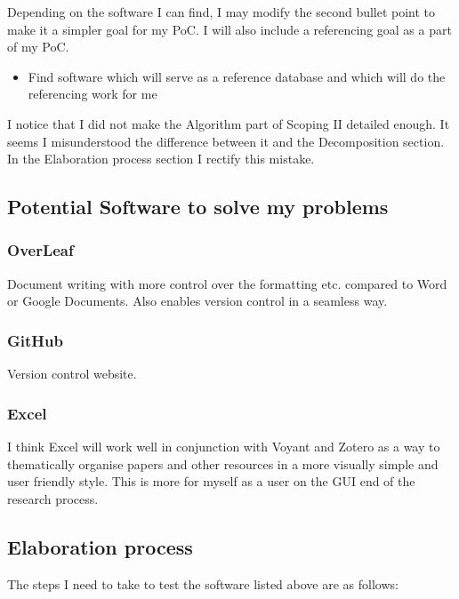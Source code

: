 \documentclass{article}
\begin{document}
\noindent
Depending on the software I can find, I may modify the second bullet point to make it a simpler goal for my PoC. I will also include a referencing goal as a part of my PoC.

\begin{itemize}
    \item Find software which will serve as a reference database and which will do the referencing work for me 
\end{itemize}


\noindent
I notice that I did not make the Algorithm part of Scoping II detailed enough. It seems I misunderstood the difference between it and the Decomposition section. In the Elaboration process section I rectify this mistake.


\subsection{Potential Software to solve my problems}

\subsubsection{OverLeaf}

Document writing with more control over the formatting etc. compared to Word or Google Documents. Also enables version control in a seamless way.

\subsubsection{GitHub}

Version control website.

\subsubsection{Excel}

I think Excel will work well in conjunction with Voyant and Zotero as a way to thematically organise papers and other resources in a more visually simple and user friendly style. This is more for myself as a user on the GUI end of the research process.

\subsection{Elaboration process}

The steps I need to take to test the software listed above are as follows:
\end{document}

